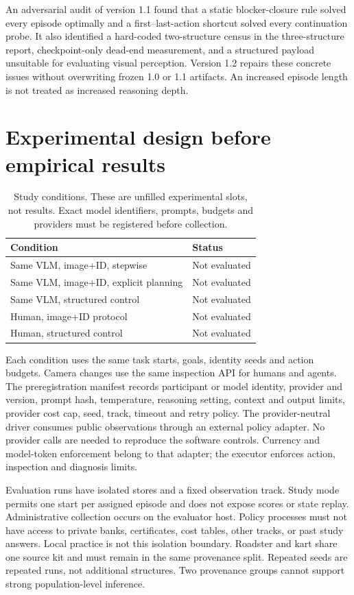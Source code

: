\documentclass[10pt,twocolumn]{article}
\begin{document}
An adversarial audit of version 1.1 found that a static blocker-closure rule
solved every episode optimally and a first--last-action shortcut solved every
continuation probe. It also identified a hard-coded two-structure census in
the three-structure report, checkpoint-only dead-end measurement, and a
structured payload unsuitable for evaluating visual perception.
Version 1.2 repairs these concrete issues without overwriting frozen 1.0 or
1.1 artifacts. An increased episode length is not treated as increased
reasoning depth.

\section{Experimental design before empirical results}
\begin{table}[t]
\centering\small
\caption{Study conditions. These are unfilled experimental slots, not results.
Exact model identifiers, prompts, budgets and providers must be registered
before collection.}
\begin{tabular}{ll}\toprule
Condition & Status\\\midrule
Same VLM, image+ID, stepwise & Not evaluated\\
Same VLM, image+ID, explicit planning & Not evaluated\\
Same VLM, structured control & Not evaluated\\
Human, image+ID protocol & Not evaluated\\
Human, structured control & Not evaluated\\\bottomrule
\end{tabular}
\label{tab:study}
\end{table}
Each condition uses the same task starts, goals, identity seeds and action
budgets. Camera changes use the same inspection API for humans and agents.
The preregistration manifest records participant or model identity, provider
and version, prompt hash, temperature, reasoning setting, context and output
limits, provider cost cap, seed, track, timeout and retry policy.
The provider-neutral driver consumes public observations through an external
policy adapter. No provider calls are needed to reproduce the software controls.
Currency and model-token enforcement belong to that adapter; the executor
enforces action, inspection and diagnosis limits.

Evaluation runs have isolated stores and a fixed observation track.
Study mode permits one start per assigned episode and does not expose scores
or state replay. Administrative collection occurs on the evaluator host.
Policy processes must not have access to private banks, certificates, cost
tables, other tracks, or past study answers. Local practice is not this
isolation boundary.
Roadster and kart share one source kit and must remain in the same provenance
split. Repeated seeds are repeated runs, not additional structures.
Two provenance groups cannot support strong population-level inference.
\end{document}
